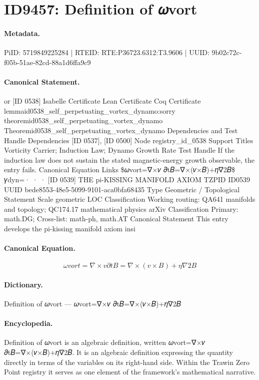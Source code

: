 \section*{ID9457: Definition of 𝜔vort}
\paragraph{Metadata.}
PiID: 5719849225284 | RTEID: RTE:P36723.6312:T3.9606 | UUID: 9b02c72c-f05b-51ae-82cd-88a1d6ffa9c9

\paragraph{Canonical Statement.}
or [ID 0538] Isabelle Certificate Lean Certificate Coq Certificate lemmaid0538\_self\_perpetuating\_vortex\_dynamo:sorry theoremid0538\_self\_perpetuating\_vortex\_dynamo Theoremid0538\_self\_perpetuating\_vortex\_dynamo Dependencies and Test Handle Dependencies [ID 0537], [ID 0500] Node registry\_id\_0538 Support Titles Vorticity Carrier; Induction Law; Dynamo Growth Rate Test Handle If the induction law does not sustain the stated magnetic-energy growth observable, the entry fails. Canonical Equation Links \$𝜔vort=∇×𝑣 𝜕t𝐵=∇×(𝑣×𝐵)+𝜂∇2𝐵\$ 𝛾dyn=· · · [ID 0539] THE pi-KISSING MANIFOLD AXIOM TZPID ID0539 UUID bede8553-48e5-5099-9101-aca0bfa68435 Type Geometric / Topological Statement Scale geometric LOC Classification Working routing: QA641 manifolds and topology; QC174.17 mathematical physics arXiv Classification Primary: math.DG; Cross-list: math-ph, math.AT Canonical Statement This entry develops the pi-kissing manifold axiom insi

\paragraph{Canonical Equation.}
\[
𝜔vort=∇×𝑣 𝜕t𝐵=∇×(𝑣×𝐵)+𝜂∇2𝐵
\]

\paragraph{Dictionary.}
Definition of 𝜔vort — 𝜔vort=∇×𝑣 𝜕t𝐵=∇×(𝑣×𝐵)+𝜂∇2𝐵

\paragraph{Encyclopedia.}
Definition of 𝜔vort is an algebraic definition, written 𝜔vort=∇×𝑣 𝜕t𝐵=∇×(𝑣×𝐵)+𝜂∇2𝐵. It is an algebraic definition expressing the quantity directly in terms of the variables on its right-hand side. Within the Trawin Zero Point registry it serves as one element of the framework's mathematical narrative.
